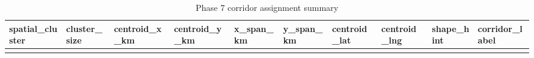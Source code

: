 \documentclass[
]{article}
\begin{document}
\begin{longtable}[]{@{}
  >{\raggedleft\arraybackslash}p{}
  >{\raggedleft\arraybackslash}p{}
  >{\raggedleft\arraybackslash}p{}
  >{\raggedleft\arraybackslash}p{}
  >{\raggedleft\arraybackslash}p{}
  >{\raggedleft\arraybackslash}p{}
  >{\raggedleft\arraybackslash}p{}
  >{\raggedleft\arraybackslash}p{}
  >{\raggedright\arraybackslash}p{}
  >{\raggedright\arraybackslash}p{}@{}}
\caption{Phase 7 corridor assignment summary}\tabularnewline
\toprule\noalign{}
\begin{minipage}[b]{\linewidth}\raggedleft
spatial\_cluster
\end{minipage} & \begin{minipage}[b]{\linewidth}\raggedleft
cluster\_size
\end{minipage} & \begin{minipage}[b]{\linewidth}\raggedleft
centroid\_x\_km
\end{minipage} & \begin{minipage}[b]{\linewidth}\raggedleft
centroid\_y\_km
\end{minipage} & \begin{minipage}[b]{\linewidth}\raggedleft
x\_span\_km
\end{minipage} & \begin{minipage}[b]{\linewidth}\raggedleft
y\_span\_km
\end{minipage} & \begin{minipage}[b]{\linewidth}\raggedleft
centroid\_lat
\end{minipage} & \begin{minipage}[b]{\linewidth}\raggedleft
centroid\_lng
\end{minipage} & \begin{minipage}[b]{\linewidth}\raggedright
shape\_hint
\end{minipage} & \begin{minipage}[b]{\linewidth}\raggedright
corridor\_label
\end{minipage} \\
\midrule\noalign{}
\endfirsthead
\toprule\noalign{}
\begin{minipage}[b]{\linewidth}\raggedleft

\end{minipage}
\end{longtable}
\end{document}
